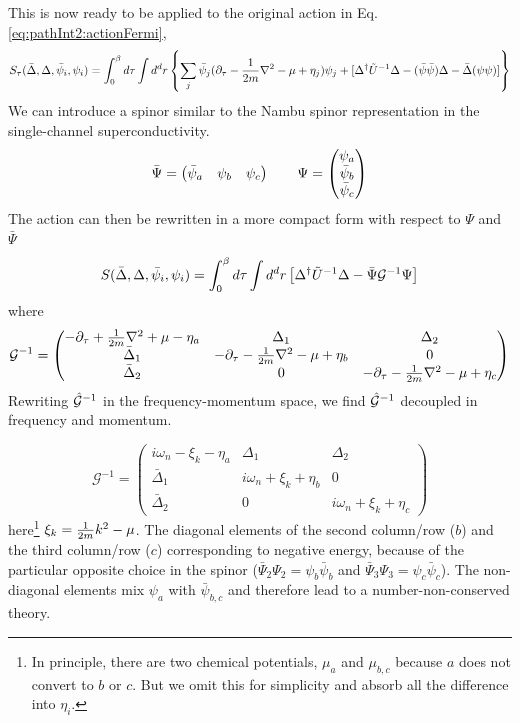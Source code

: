 This is now ready to be applied to the original action in Eq. \ref{eq:pathInt2:actionFermi}, 
\begin{equation}\label{eq:pathInt2:actionMix}
S_{\tau}(\bar\Delta,\Delta,\bar\psi_{i},\psi_{i})=\int^{\beta}_{0}d\tau\int{d^{d}r}\left\{\sum_{j}\bar\psi_{j}(\partial_\tau-\frac{1}{2m}\nabla^{2}-\mu+\eta_{j})\psi_{j}
+[\Delta^{\dagger}\tilde{U}^{-1}\Delta-(\bar\psi\bar\psi)\Delta-\bar\Delta{}(\psi\psi)]\right\}
\end{equation}
We can introduce  a spinor similar to the Nambu spinor representation in the single-channel superconductivity.  
\begin{equation}
\bar\Psi=\begin{pmatrix}\bar\psi_{a}&\psi_{b}&\psi_{c}\end{pmatrix}\qquad\Psi=\begin{pmatrix}\psi_{a}\\\bar\psi_{b}\\\bar\psi_{c}\end{pmatrix}
\end{equation}
The action can then be rewritten in a more compact form with respect to $\Psi$ and $\bar\Psi$
\begin{equation}\label{eq:pathInt2:actionMixCompact}
S(\bar\Delta,\Delta,\bar\psi_{i},\psi_{i})=\int^{\beta}_{0}d\tau\int{d^{d}r}
	\left[\Delta^{\dagger}\tilde{U}^{-1}\Delta-\bar\Psi\mathcal{G}^{-1}\Psi\right]
\end{equation}
where 
\begin{equation}
\mathcal{G}^{-1}=
\begin{pmatrix}\label{eq:pathInt2:nGDelta}
-\partial_{\tau}+\frac{1}{2m}\nabla^{2}+\mu-\eta_{a}&\Delta_{1}&\Delta_{2}\\
\bar\Delta_{1}&-\partial_{\tau}-\frac{1}{2m}\nabla^{2}-\mu+\eta_{b}&0\\
\bar\Delta_{2}&0&-\partial_{\tau}-\frac{1}{2m}\nabla^{2}-\mu+\eta_{c}
\end{pmatrix}
\end{equation}
Rewriting  $\hat{\mathcal{G}}^{-1}$ in the frequency-momentum space, we find $\hat{\mathcal{G}}^{-1}$   decoupled in frequency and momentum. 

\begin{equation}\label{eq:pathInt2:nGDeltaK}
\mathcal{G}^{-1}=
\begin{pmatrix}
i\omega_{n}-\xi_{k}-\eta_{a}&\Delta_{1}&\Delta_{2}\\
\bar\Delta_{1}&i\omega_{n}+\xi_{k}+\eta_{b}&0\\
\bar\Delta_{2}&0&i\omega_{n}+\xi_{k}+\eta_{c}
\end{pmatrix}
\end{equation}
here\footnote{In principle, there are two chemical potentials, $\mu_{a}$ and $\mu_{b,c}$ because $a$ does not convert to $b$ or $c$.  But we omit this for simplicity and absorb all the difference into $\eta_{i}$.} $\xi_{k}=\frac{1}{2m}k^{2}-\mu$. The diagonal elements of the second column/row (${b}$) and the third column/row (${c}$) corresponding to negative energy, because of the particular opposite choice in the  spinor ($\bar\Psi_{2}\Psi_{2}=\psi_{b}\bar\psi_{b}$ and $\bar\Psi_{3}\Psi_{3}=\psi_{c}\bar\psi_{c}$).  The non-diagonal elements mix $\psi_{a}$ with $\bar{\psi}_{b,c}$  and therefore lead to a number-non-conserved theory.  

